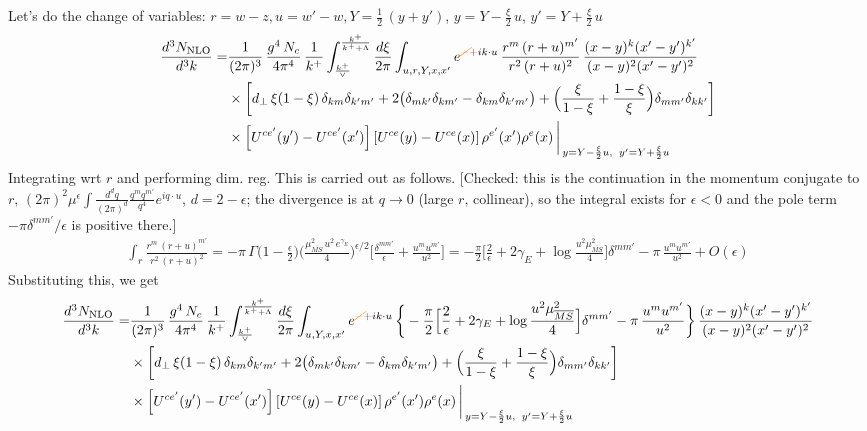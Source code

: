 \documentclass[9pt]{article}
\numberwithin{equation}{section}
\begin{document}
Let's do the change of variables: $r = w-z, u = w'-w, Y = \frac{1}{2}\, (y+y')$, $y = Y - \frac{\xi}{2}\,u$, $y' = Y +\frac{\xi}{2}\,u$
\begin{align}
\frac{d^{3}N_{\rm NLO}}{d^{3}k}= &\frac{1}{(2\pi)^{3}}\,\frac{g^{4}\,N_{c}}{4\pi^{4}}\,\frac{1}{k^{+}}\int_{\frac{k^{+}}{\vee}}^{\frac{k^{+}}{k^{+}+\Lambda}}\frac{d\xi}{2\pi}\int_{u,r,Y,x,x'}e^{{\color{orange}\cancel{-}}{\color{red}+}ik\cdot u}\,\frac{r^{m}\,(r+u)^{m'}}{r^{2}\,(r+u)^{2}}\,\frac{(x-y)^{k}(x'-y')^{k'}}{(x-y)^{2}(x'-y')^{2}}\notag\\
&\times\bigg[d_{\perp}\,\xi(1-\xi)\,\delta_{km}\delta_{k'm'}+2\big(\delta_{mk'}\delta_{km'}-\delta_{km}\delta_{k'm'}\big)+\Big(\frac{\xi}{1-\xi}+\frac{1-\xi}{\xi}\Big)\delta_{mm'}\delta_{kk'}\bigg]\notag\\
&\times\left[U^{ce'}(y') - U^{ce'}(x')\right]\left[U^{ce}(y) - U^{ce}(x)\right]\rho^{e'}(x')\rho^{e}(x)\,\bigg|_{\,y=Y-\frac{\xi}{2}u,\;\;y'=Y+\frac{\xi}{2}u}
\end{align}
Integrating wrt $r$ and performing dim. reg. This is carried out as follows. {\color{red}[Checked: this is the continuation in the momentum conjugate to $r$, $(2\pi)^{2}\mu^{\epsilon}\int\frac{d^{d}q}{(2\pi)^{d}}\frac{q^{m}q^{m'}}{q^{4}}e^{iq\cdot u}$, $d=2-\epsilon$; the divergence is at $q\to0$ (large $r$, collinear), so the integral exists for $\epsilon<0$ and the pole term $-\pi\delta^{mm'}/\epsilon$ is positive there.]}
\begin{align}
\int_{r}\frac{r^{m}\,(r+u)^{m'}}{r^{2}\,(r+u)^{2}}
=-\pi\,\Gamma\big(1-\tfrac{\epsilon}{2}\big)\Big(\frac{\mu^{2}_{\overline{MS}}\,u^{2}\,e^{\gamma_E}}{4}\Big)^{\epsilon/2}\Big[\frac{\delta^{mm'}}{\epsilon}+\frac{u^{m}u^{m'}}{u^{2}}\Big]
=-\frac{\pi}{2}\Big[\frac{2}{\epsilon}+2\gamma_{E}+\log\frac{u^{2}\mu^{2}_{\overline{MS}}}{4}\Big]\delta^{mm'}-\pi\,\frac{u^{m}u^{m'}}{u^{2}}+O(\epsilon)
\end{align}
Substituting this, we get
\begin{align}
\frac{d^{3}N_{\rm NLO}}{d^{3}k}= &\frac{1}{(2\pi)^{3}}\,\frac{g^{4}\,N_{c}}{4\pi^{4}}\,\frac{1}{k^{+}}\int_{\frac{k^{+}}{\vee}}^{\frac{k^{+}}{k^{+}+\Lambda}}\frac{d\xi}{2\pi}\int_{u,Y,x,x'}e^{{\color{orange}\cancel{-}}{\color{red}+}ik\cdot u}\,
\bigg\{-\frac{\pi}{2}\Big[\frac{2}{\epsilon}+2\gamma_{E}+\log\frac{u^{2}\mu^{2}_{\overline{MS}}}{4}\Big]\delta^{mm'}-\pi\,\frac{u^{m}u^{m'}}{u^{2}}\bigg\}\,\frac{(x-y)^{k}(x'-y')^{k'}}{(x-y)^{2}(x'-y')^{2}}\notag\\
&\times\bigg[d_{\perp}\,\xi(1-\xi)\,\delta_{km}\delta_{k'm'}+2\big(\delta_{mk'}\delta_{km'}-\delta_{km}\delta_{k'm'}\big)+\Big(\frac{\xi}{1-\xi}+\frac{1-\xi}{\xi}\Big)\delta_{mm'}\delta_{kk'}\bigg]\notag\\
&\times\left[U^{ce'}(y') - U^{ce'}(x')\right]\left[U^{ce}(y) - U^{ce}(x)\right]\rho^{e'}(x')\rho^{e}(x)\,\bigg|_{\,y=Y-\frac{\xi}{2}u,\;\;y'=Y+\frac{\xi}{2}u}
\end{align}
\end{document}
